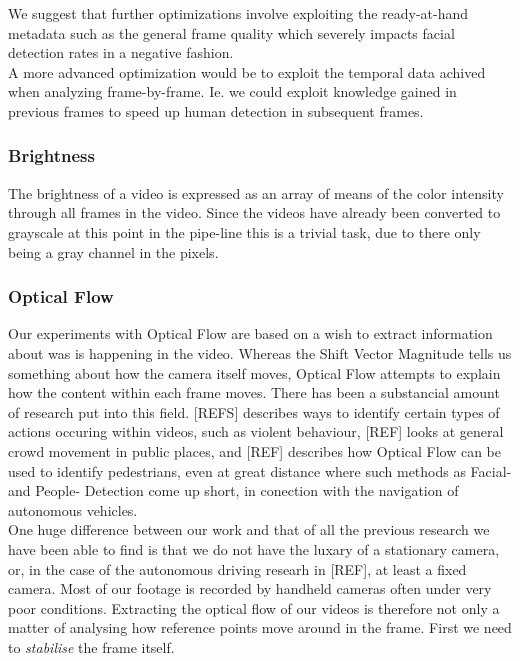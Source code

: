 We suggest that further optimizations involve exploiting the ready-at-hand metadata such as the general frame quality which severely impacts facial detection rates in a negative fashion.\\
A more advanced optimization would be to exploit the temporal data achived when analyzing frame-by-frame. Ie. we could exploit knowledge gained in previous frames to speed up human detection in subsequent frames.

%
\subsubsection{Brightness}
%
The brightness of a video is expressed as an array of means of the color intensity through all frames in the video. Since the videos have already been converted to grayscale at this point in the pipe-line this is a trivial task, due to there only being a gray channel in the pixels.
%
\subsubsection{Optical Flow}
%
%
%
Our experiments with Optical Flow are based on a wish to extract information about was is happening in the video. Whereas the Shift Vector Magnitude tells us something about how the camera itself moves, Optical Flow attempts to explain how the content within each frame moves. There has been a substancial amount of research put into this field. [REFS] describes ways to identify certain types of actions occuring within videos, such as violent behaviour, [REF] looks at general crowd movement in public places, and [REF] describes how Optical Flow can be used to identify pedestrians, even at great distance where such methods as Facial- and People- Detection come up short, in conection with the navigation of autonomous vehicles.\\
%
One huge difference between our work and that of all the previous research we have been able to find is that we do not have the luxary of a stationary camera, or, in the case of the autonomous driving researh in [REF], at least a fixed camera. Most of our footage is recorded by handheld cameras often under very poor conditions. Extracting the optical flow of our videos is therefore not only a matter of analysing how reference points move around in the frame. First we need to \textit{stabilise} the frame itself.\\
%
